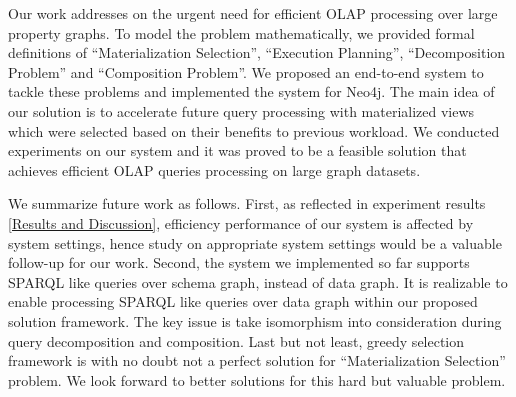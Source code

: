 Our work addresses on the urgent need for efficient OLAP processing over large property graphs.  To model the problem mathematically, we provided formal definitions of ``Materialization Selection'', ``Execution Planning'', ``Decomposition Problem'' and ``Composition Problem''. We proposed an end-to-end system to tackle these problems and implemented the system for Neo4j. The main idea of our solution is to accelerate future query processing with materialized views which were selected based on their benefits to previous workload. We conducted experiments on our system and it was proved to be a feasible solution that achieves efficient OLAP queries processing on large graph datasets.   

We summarize future work as follows. First, as reflected in experiment results \ref{Results and Discussion}, efficiency performance of our system is affected by system settings, hence study on appropriate system settings would be a valuable follow-up for our work. Second, the system we implemented so far supports SPARQL like queries over schema graph, instead of data graph. It is realizable to enable processing SPARQL like queries over data graph within our proposed solution framework. The key issue is take isomorphism into consideration during query decomposition and composition. Last but not least, greedy selection framework is with no doubt not a perfect solution for ``Materialization Selection'' problem. We look forward to better solutions for this hard but valuable problem.



